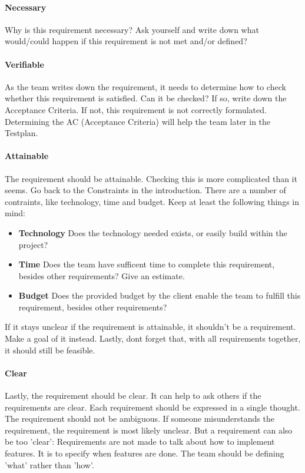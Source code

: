 \documentclass[10pt]{report}
\begin{document}
\paragraph{Necessary}

Why is this requirement necessary? Ask yourself and write down what would/could happen if this requirement is not met and/or defined?

\paragraph{Verifiable}

As the team writes down the requirement, it needs to determine how to check whether this requirement is satisfied. Can it be checked? If so, write down the Acceptance Criteria. If not, this requirement is not correctly formulated. Determining the AC (Acceptance Criteria) will help the team later in the Testplan.

\paragraph{Attainable}

The requirement should be attainable. Checking this is more complicated than it seems. Go back to the Constraints in the introduction. There are a number of contraints, like technology, time and budget. Keep at least the following things in mind:

\begin{itemize}
	\item \textbf{Technology} Does the technology needed exists, or easily build within the project?
	\item \textbf{Time} Does the team have sufficent time to complete this requirement, besides other requirements? Give an estimate.
	\item \textbf{Budget} Does the provided budget by the client enable the team to fulfill this requirement, besides other requirements?
\end{itemize}

If it stays unclear if the requirement is attainable, it shouldn't be a requirement. Make a goal of it instead. Lastly, dont forget that, with all requirements together, it should still be feasible.

\paragraph{Clear}

Lastly, the requirement should be clear. It can help to ask others if the requirements are clear. Each requirement should be expressed in a single thought. The requirement should not be ambiguous. If someone misunderstands the requirement, the requirement is most likely unclear. But a requirement can also be too 'clear': Requirements are not made to talk about how to implement features. It is to specify when features are done. The team should be defining 'what' rather than 'how'.
\end{document}
